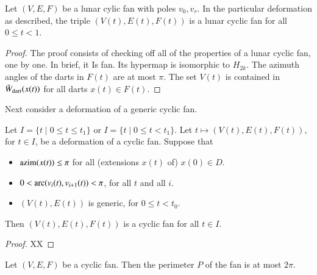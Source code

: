 \begin{lemma} Let $(V,E,F)$ be a lunar cylic fan with poles $v_0,v_r$.  In the particular deformation as described, the triple $(V(t),E(t),F(t))$ is a lunar cyclic fan for all $0\le t< 1$.
\end{lemma}

\begin{proof}  The proof consists of checking off all of the properties of a lunar cyclic fan, one by one.  In brief, it Is fan.  Its hypermap is isomorphic to $H_{2k}$.  The azimuth angles of the darts in $F(t)$ are at most $\pi$.  The set $V(t)$ is contained in $\bar W_{\text{dart}}(x(t))$ for all darts $x(t)\in F(t)$.
\end{proof}

Next  consider a deformation of a generic cyclic fan.



\begin{lemma} Let $I = \{t\mid 0\le t\le t_1\}$ or $I=\{t\mid 0\le t < t_1\}$.  Let $t\mapsto (V(t),E(t),F(t))$, for $t\in I$, be a deformation of a cyclic fan.  Suppose that 
\begin{itemize} 
\item ${\operatorname{azim}}(x(t))\le \pi$ for all (extensions $x(t)$ of) $x(0)\in D$.
\item $0 < \operatorname{arc}(v_i(t),v_{i+1}(t)) < \pi$, for all $t$ and all $i$.
\item $(V(t),E(t))$ is generic, for $0\le t<t_0$.
\end{itemize}
Then $(V(t),E(t),F(t))$ is a cyclic fan for all $t\in I$.
\end{lemma}

\begin{proof}
XX
\end{proof}






\begin{lemma}
Let $(V,E,F)$ be a cyclic fan.  Then the perimeter $P$ of the fan is at most $2\pi$.
\end{lemma}

